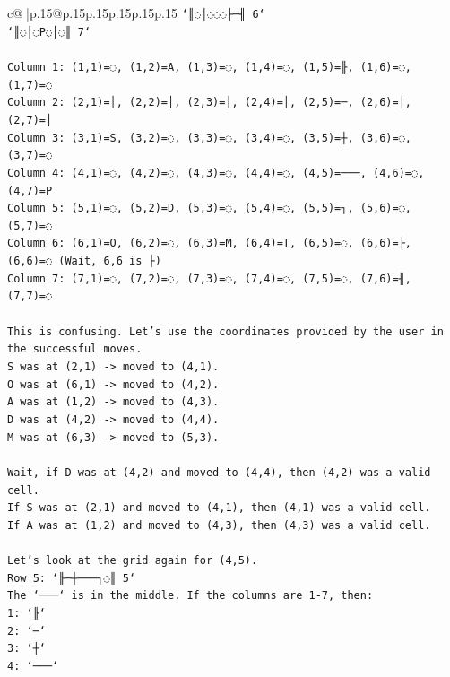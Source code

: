 \documentclass{article}
\begin{document}
{\begin{supertabular}{c@{$\;$}|p{.15\linewidth}@{}p{.15\linewidth}p{.15\linewidth}p{.15\linewidth}p{.15\linewidth}p{.15\linewidth}}
{{{\texttt{`║◌│◌◌◌├─╢ 6`} \\
\texttt{`║◌│◌P◌│◌║ 7`} \\
\\ 
\texttt{Column 1: (1,1)=◌, (1,2)=A, (1,3)=◌, (1,4)=◌, (1,5)=╟, (1,6)=◌, (1,7)=◌} \\
\texttt{Column 2: (2,1)=│, (2,2)=│, (2,3)=│, (2,4)=│, (2,5)=─, (2,6)=│, (2,7)=│} \\
\texttt{Column 3: (3,1)=S, (3,2)=◌, (3,3)=◌, (3,4)=◌, (3,5)=┼, (3,6)=◌, (3,7)=◌} \\
\texttt{Column 4: (4,1)=◌, (4,2)=◌, (4,3)=◌, (4,4)=◌, (4,5)=───, (4,6)=◌, (4,7)=P} \\
\texttt{Column 5: (5,1)=◌, (5,2)=D, (5,3)=◌, (5,4)=◌, (5,5)=┐, (5,6)=◌, (5,7)=◌} \\
\texttt{Column 6: (6,1)=O, (6,2)=◌, (6,3)=M, (6,4)=T, (6,5)=◌, (6,6)=├, (6,6)=◌ (Wait, 6,6 is ├)} \\
\texttt{Column 7: (7,1)=◌, (7,2)=◌, (7,3)=◌, (7,4)=◌, (7,5)=◌, (7,6)=╢, (7,7)=◌} \\
\\ 
\texttt{This is confusing. Let's use the coordinates provided by the user in the successful moves.} \\
\texttt{S was at (2,1) {-}> moved to (4,1).} \\
\texttt{O was at (6,1) {-}> moved to (4,2).} \\
\texttt{A was at (1,2) {-}> moved to (4,3).} \\
\texttt{D was at (4,2) {-}> moved to (4,4).} \\
\texttt{M was at (6,3) {-}> moved to (5,3).} \\
\\ 
\texttt{Wait, if D was at (4,2) and moved to (4,4), then (4,2) was a valid cell.} \\
\texttt{If S was at (2,1) and moved to (4,1), then (4,1) was a valid cell.} \\
\texttt{If A was at (1,2) and moved to (4,3), then (4,3) was a valid cell.} \\
\\ 
\texttt{Let's look at the grid again for (4,5).} \\
\texttt{Row 5: `╟─┼───┐◌║ 5`} \\
\texttt{The `───` is in the middle. If the columns are 1{-}7, then:} \\
\texttt{1: `╟`} \\
\texttt{2: `─`} \\
\texttt{3: `┼`} \\
\texttt{4: `───`} \\
}}}
\end{supertabular}}
\end{document}
